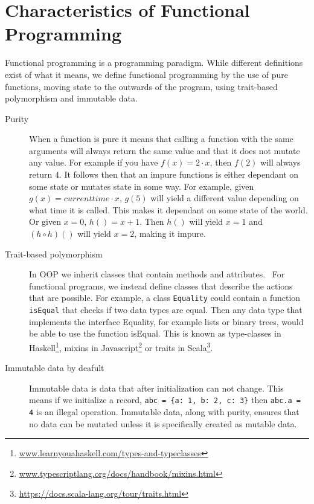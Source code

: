 \section{Characteristics of Functional Programming}\label{functionalprogramming}

Functional programming is a programming paradigm. While different definitions exist
of what it means, we define functional programming by the use of pure functions,
moving state to the outwards of the program, using trait-based polymorphism and
immutable data.

\begin{description}
\item[ Purity ]

When a function is pure it means that calling a function with the same arguments
        will always return the same value and that it does not mutate any value.
        For example if you have $f(x) = 2\cdot x$, then $f(2)$ will always
        return $4$. It follows then that an impure functions is either dependant
        on some state or mutates state in some way. For example, given $g(x) =
        currenttime \cdot x$, $g(5)$ will yield a different value depending on
        what time it is called. This makes it dependant on some state of the
        world. Or given $x=0$, $h()=x+1$. Then $h()$ will yield $x=1$ and $(h
        \circ h)()$ will yield $x=2$, making it impure.~\cite{wikipedia_pure}

	\item[ Trait-based polymorphism ]

		In OOP we inherit classes that contain methods and
attributes.~\cite{Gamma:1995:DPE:186897} For functional programs, we instead
define classes that describe the actions that are possible. For example, a
class \texttt{Equality} could contain a function \texttt{isEqual} that checks
if two data types are equal. Then any data type that implements the interface
Equality, for example lists or binary trees, would be able to use the function
isEqual.  This is known as type-classes in
Haskell\footnote{\url{www.learnyouahaskell.com/types-and-typeclasses}}, mixins
in Javascript\footnote{\url{www.typescriptlang.org/docs/handbook/mixins.html}}
or traits in Scala\footnote{\url{https://docs.scala-lang.org/tour/traits.html}}.

\item[ Immutable data by deafult ]

Immutable data is data that after initialization can not change. This means if
we initialize a record, \texttt{abc = \{a: 1, b: 2, c: 3\}} then \texttt{abc.a
= 4} is an illegal operation. Immutable data, along with purity, ensures that
no data can be mutated unless it is specifically created as mutable data.


\end{description}
